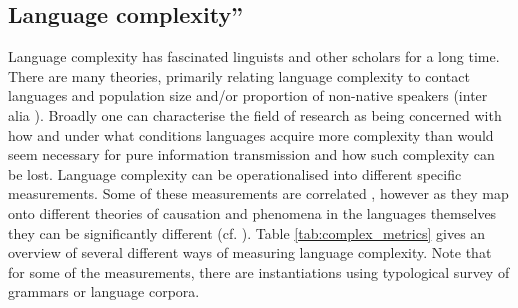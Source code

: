 \documentclass[USenglish]{article}
\begin{document}
\subsection{Language complexity''}
Language complexity has fascinated linguists and other scholars for a long time. There are many theories, primarily relating language complexity to contact languages \citep{mcwhorter_2003} and population size and/or proportion of non-native speakers (inter alia \citet{wray2007consequences, dahl2004growth, lupyan2010language, bentz2013languages, bentz2015adaptive, raviv2019larger, koplenig2019language, shcherbakova2023societies}). Broadly one can characterise the field of research as being concerned with how and under what conditions languages acquire more complexity than would seem necessary for pure information transmission and how such complexity can be lost.
Language complexity can be operationalised into different specific measurements. 
Some of these measurements are correlated \citep{bentz2016comparison}, however as they map onto different theories of causation and phenomena in the languages themselves they can be significantly different (cf. \citet{lupyan2024cautionary}). 
Table \ref{tab:complex_metrics} gives an overview of several different ways of measuring language complexity. Note that for some of the measurements, there are instantiations using typological survey of grammars or language corpora.
\end{document}
